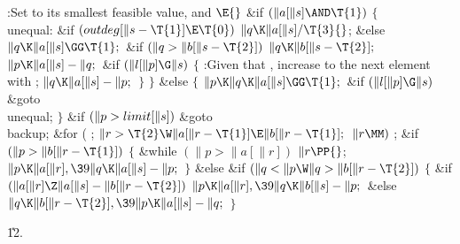 \Y\B\4:Set  to its smallest feasible value, and \X${}\E{}$\6
\&{if} ${}(\|a[\|s]\AND\T{1}){}$\5
${}\{{}$\1\6
\4\\{unequal}:\5
\&{if} ${}(\\{outdeg}[\|s-\T{1}]\E\T{0}){}$\1\5
${}\|q\K\|a[\|s]/\T{3}{}$;\5
\2\&{else}\1\5
${}\|q\K\|a[\|s]\GG\T{1};{}$\2\6
\&{if} ${}(\|q>\|b[\|s-\T{2}]){}$\1\5
${}\|q\K\|b[\|s-\T{2}];{}$\2\6
${}\|p\K\|a[\|s]-\|q;{}$\6
\&{if} ${}(\|l[\|p]\G\|s){}$\5
${}\{{}$\1\6
:Given that , increase  to the next element
with \X;\6
${}\|q\K\|a[\|s]-\|p;{}$\6
\4${}\}{}$\2\6
\4${}\}{}$\5
\2\&{else}\5
${}\{{}$\1\6
${}\|p\K\|q\K\|a[\|s]\GG\T{1};{}$\6
\&{if} ${}(\|l[\|p]\G\|s){}$\1\5
\&{goto} \\{unequal};\2%
\6
\4${}\}{}$\2\6
\&{if} ${}(\|p>\\{limit}[\|s]){}$\1\5
\&{goto} \\{backup};\2\6
\&{for} ( ; ${}\|r>\T{2}\W\|a[\|r-\T{1}]\E\|b[\|r-\T{1}];{}$ ${}\|r\MM){}$\1\5
;\2\6
\&{if} ${}(\|p>\|b[\|r-\T{1}]){}$\5
${}\{{}$\1\6
\&{while} ${}(\|p>\|a[\|r]){}$\1\5
${}\|r\PP{}$;\2\6
${}\|p\K\|a[\|r],\39\|q\K\|a[\|s]-\|p;{}$\6
\4${}\}{}$\5
\2\&{else} \&{if} ${}(\|q<\|p\W\|q>\|b[\|r-\T{2}]){}$\5
${}\{{}$\1\6
\&{if} ${}(\|a[\|r]\Z\|a[\|s]-\|b[\|r-\T{2}]){}$\1\5
${}\|p\K\|a[\|r],\39\|q\K\|b[\|s]-\|p;{}$\2\6
\&{else}\1\5
${}\|q\K\|b[\|r-\T{2}],\39\|p\K\|a[\|s]-\|q;{}$\2\6
\4${}\}{}$\2\par
\U12.\fi

